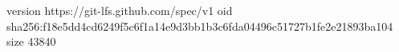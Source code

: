 version https://git-lfs.github.com/spec/v1
oid sha256:f18e5dd4cd6249f5c6f1a14e9d3bb1b3c6fda04496c51727b1fe2e21893ba104
size 43840
